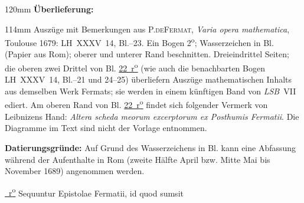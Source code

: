 \begin{ledgroupsized}[r]{120mm}
\footnotesize
\pstart
\noindent\textbf{Überlieferung:}
\pend
\end{ledgroupsized}
\begin{ledgroupsized}[r]{114mm}
\footnotesize
\pstart
\parindent -6mm
%
Auszüge mit Bemerkungen aus
%
\textsc{P.\;de\;Fermat},
\cite{00533}\textit{Varia opera mathematica}, Toulouse 1679:
LH~XXXV~14, Bl.--23. 
Ein Bogen 2\textsuperscript{o};
{Wasserzeichen} in Bl. (Papier aus Rom); %
oberer und unterer Rand beschnitten.
Dreieindrittel Seiten;
die oberen zwei Drittel von Bl.\;%
\href{\Scan{LH_035_14_02_022r}}
{22~r\textsuperscript{o}} (wie auch die benachbarten Bogen LH~XXXV~14, Bl.--21 und 24--25) überliefern Auszüge mathematischen Inhalts aus demselben \cite{00533}Werk Fermats; sie werden in einem künftigen Band von \textit{LSB}~VII ediert.
Am oberen Rand von Bl.\;%
\href{\Scan{LH_035_14_02_022r}}
{22~r\textsuperscript{o}} findet sich folgender Vermerk von Leibnizens Hand:
\textit{Altera scheda meorum excerptorum ex Posthumis Fermatii}.
Die Diagramme im Text sind nicht der Vorlage entnommen.
\pend
\end{ledgroupsized}
\vspace{5mm}
\begin{ledgroup}
\footnotesize
\pstart
\noindent
\textbf{Datierungsgründe:}
Auf Grund des Wasserzeichens in Bl. kann eine Abfassung während der Aufenthalte in Rom (zweite Hälfte April bzw. Mitte Mai bis November 1689) angenommen werden.
\pend
\end{ledgroup}
\vspace{8mm}
\pstart
\noindent
\href{\Scan{LH_035_14_02_022r}}%
{~r\textsuperscript{o}\rbrack} 
Sequuntur Epistolae Fermatii,
id quod sumsit 

